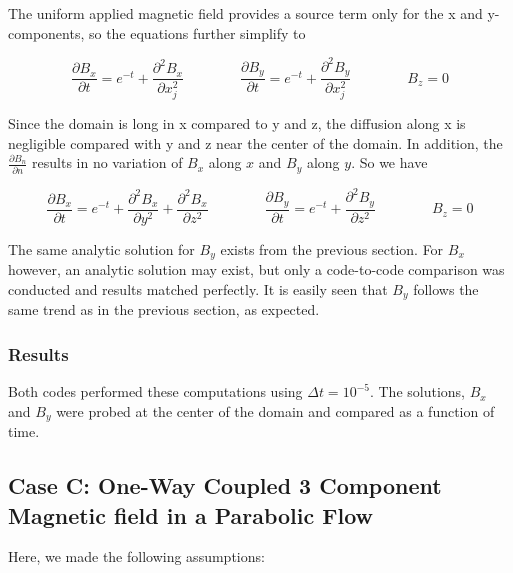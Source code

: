\documentclass[11pt]{article}
\newcommand{\figS}{22.1em}
\newcommand{\figH}{\figS}
\newcommand{\figW}{\figS}
\begin{document}
The uniform applied magnetic field provides a source term only for the x and y-components, so the equations further simplify to

\begin{equation}
	\frac{\partial B_x}{\partial t}
	=
	e^{-t}
	+
	\frac{\partial^2 B_x}{\partial x_j^2}
	\qquad \qquad
	\frac{\partial B_y}{\partial t}
	=
	e^{-t}
	+
	\frac{\partial^2 B_y}{\partial x_j^2}
	\qquad \qquad
	B_z = 0
\end{equation}

Since the domain is long in x compared to y and z, the diffusion along x is negligible compared with y and z near the center of the domain. In addition, the $\frac{\partial B_n}{\partial n}$ results in no variation of $B_x$ along $x$ and $B_y$ along $y$. So we have

\begin{equation}
	\frac{\partial B_x}{\partial t}
	=
	e^{-t}
	+
	\frac{\partial^2 B_x}{\partial y^2}
	+
	\frac{\partial^2 B_x}{\partial z^2}
	\qquad \qquad
	\frac{\partial B_y}{\partial t}
	=
	e^{-t}
	+
	\frac{\partial^2 B_y}{\partial z^2}
	\qquad \qquad
	B_z = 0
\end{equation}

The same analytic solution for $B_y$ exists from the previous section. For $B_x$ however, an analytic solution may exist, but only a code-to-code comparison was conducted and results matched perfectly. It is easily seen that $B_y$ follows the same trend as in the previous section, as expected.

\subsubsection{Results}
Both codes performed these computations using $\Delta t = 10^{-5}$. The solutions, $B_x$ and $B_y$ were probed at the center of the domain and compared as a function of time.

\begin{figure}[H]
 \centering
   \caption[Optional ]{}
\end{figure}


\subsection{Case C: One-Way Coupled 3 Component Magnetic field in a Parabolic Flow}

Here, we made the following assumptions:
\end{document}
